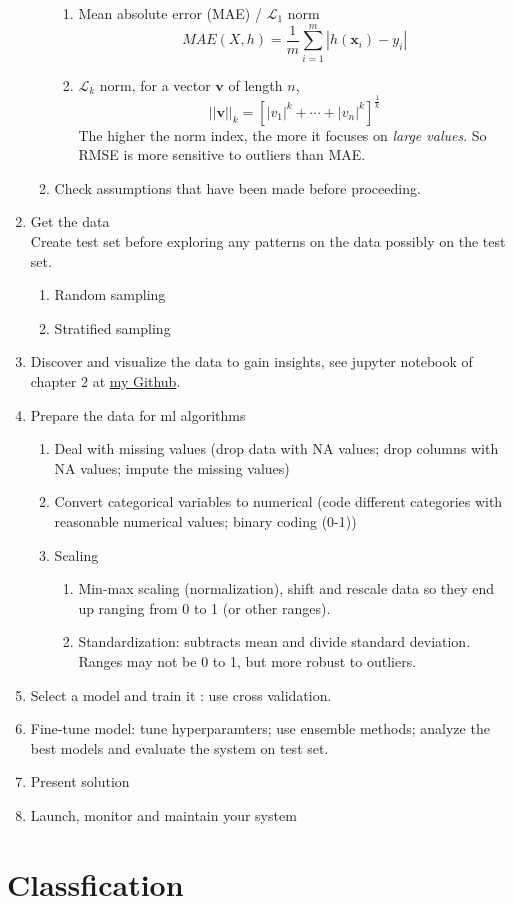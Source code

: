 \documentclass[12pt,oneside,a4paper]{article}
\numberwithin{equation}{section}
\newcommand{\bfv}{\boldsymbol{v}}
\newcommand{\bfx}{\boldsymbol{x}}
\begin{document}
\begin{enumerate}
\begin{enumerate}
\begin{enumerate}
\item Mean absolute error (MAE) / $\mathcal{L}_1$ norm
\begin{equation}
MAE(X, h) =\frac{1}{m} \sum_{i=1}^{m}|h(\bfx_{i}) - y_{i}|
\end{equation}
\item $\mathcal{L}_k$ norm, for a vector $\bfv$ of length $n$,
\begin{equation}
||\bfv||_k = \left[|v_1|^k + \cdots + |v_n|^k\right]^{\frac{1}{k}}
\end{equation}
The higher the norm index, the more it focuses on \emph{large values}. So RMSE is more sensitive to outliers than MAE.
\end{enumerate}
\item Check assumptions that have been made before proceeding. 
\end{enumerate}
\item Get the data \\
Create test set before exploring any patterns on the data possibly on the test set.
\begin{enumerate}
\item Random sampling
\item Stratified sampling
\end{enumerate}
\item Discover and visualize the data to gain insights, see jupyter notebook of chapter 2 at \href{https://github.com/QianqianShan/HandsOnMachineLearning}{my Github}. 
\item Prepare the data for ml algorithms 
\begin{enumerate}
\item Deal with missing values (drop data with NA values; drop columns with NA values; impute the missing values)
\item Convert categorical variables to numerical (code different categories with reasonable numerical values; binary coding (0-1))
\item Scaling 
\begin{enumerate}
\item Min-max scaling (normalization), shift and rescale data so they end up ranging from 0 to 1 (or other ranges). 
\item Standardization: subtracts mean and divide standard deviation. Ranges may not be 0 to 1, but more robust to outliers.
\end{enumerate}
\end{enumerate}
\item Select a model and train it : use cross validation. 
\item Fine-tune model: tune hyperparamters; use ensemble methods; analyze the best models and evaluate the system on test set.  
\item Present solution
\item Launch, monitor and maintain your system 
\end{enumerate} 

\section{Classfication}
\end{document}
